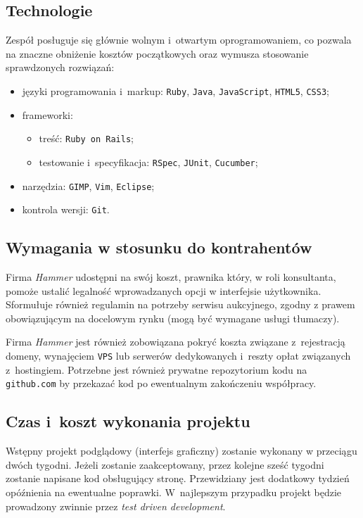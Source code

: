 \documentclass[10pt,a4paper]{article}
\begin{document}
\subsection{Technologie}
Zespół posługuje się głównie wolnym i~otwartym oprogramowaniem, co pozwala na
znaczne obniżenie kosztów początkowych oraz wymusza stosowanie sprawdzonych rozwiązań:
\begin{itemize}
  \item języki programowania i~markup: \texttt{Ruby}, \texttt{Java},
    \texttt{JavaScript}, \texttt{HTML5}, \texttt{CSS3};
  \item frameworki:
    \begin{itemize}
      \item treść: \texttt{Ruby on Rails};
      \item testowanie i~specyfikacja: \texttt{RSpec}, \texttt{JUnit},
        \texttt{Cucumber};
    \end{itemize}
  \item narzędzia: \texttt{GIMP}, \texttt{Vim}, \texttt{Eclipse};
  \item kontrola wersji: \texttt{Git}.
\end{itemize}

\subsection{Wymagania w stosunku do kontrahentów}
\label{sec:wymagania_od_kontrahenta}
Firma \emph{Hammer} udostępni na swój koszt, prawnika który, w roli
konsultanta, pomoże ustalić legalność wprowadzanych opcji w interfejsie
użytkownika. Sformułuje również regulamin na potrzeby serwisu aukcyjnego,
zgodny z prawem obowiązującym na docelowym rynku (mogą być wymagane usługi
tłumaczy).

Firma \emph{Hammer} jest również zobowiązana pokryć koszta związane
z~rejestracją domeny, wynajęciem \texttt{VPS} lub serwerów dedykowanych
i~reszty opłat związanych z~hostingiem. Potrzebne jest również prywatne
repozytorium kodu na \texttt{github.com} by przekazać kod po ewentualnym
zakończeniu współpracy.

\subsection{Czas i~koszt wykonania projektu}
Wstępny projekt podglądowy (interfejs graficzny) zostanie wykonany w przeciągu
dwóch tygodni. Jeżeli zostanie zaakceptowany, przez kolejne sześć tygodni
zostanie napisane kod obsługujący stronę. Przewidziany jest dodatkowy tydzień
opóźnienia na ewentualne poprawki. W~najlepszym przypadku projekt będzie
prowadzony zwinnie przez \emph{test driven development}.
\end{document}
